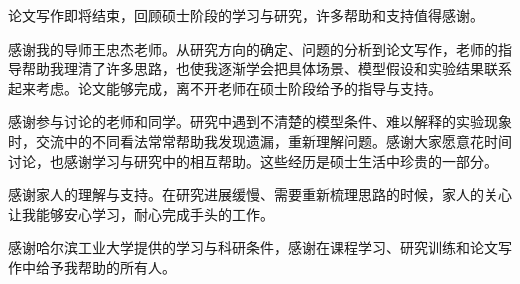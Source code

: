 
论文写作即将结束，回顾硕士阶段的学习与研究，许多帮助和支持值得感谢。

感谢我的导师王忠杰老师。从研究方向的确定、问题的分析到论文写作，老师的指导帮助我理清了许多思路，也使我逐渐学会把具体场景、模型假设和实验结果联系起来考虑。论文能够完成，离不开老师在硕士阶段给予的指导与支持。

感谢参与讨论的老师和同学。研究中遇到不清楚的模型条件、难以解释的实验现象时，交流中的不同看法常常帮助我发现遗漏，重新理解问题。感谢大家愿意花时间讨论，也感谢学习与研究中的相互帮助。这些经历是硕士生活中珍贵的一部分。

感谢家人的理解与支持。在研究进展缓慢、需要重新梳理思路的时候，家人的关心让我能够安心学习，耐心完成手头的工作。

感谢哈尔滨工业大学提供的学习与科研条件，感谢在课程学习、研究训练和论文写作中给予我帮助的所有人。
